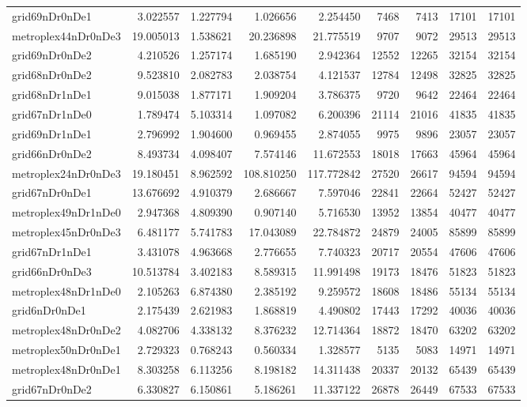 \begin{longtable}{|l|r|r|r|r|r|r|r|r|}
grid69nDr0nDe1 & 3.022557 & 1.227794 & 1.026656 & 2.254450 & 7468 & 7413 & 17101 & 17101 \\
metroplex44nDr0nDe3 & 19.005013 & 1.538621 & 20.236898 & 21.775519 & 9707 & 9072 & 29513 & 29513 \\
grid69nDr0nDe2 & 4.210526 & 1.257174 & 1.685190 & 2.942364 & 12552 & 12265 & 32154 & 32154 \\
grid68nDr0nDe2 & 9.523810 & 2.082783 & 2.038754 & 4.121537 & 12784 & 12498 & 32825 & 32825 \\
grid68nDr1nDe1 & 9.015038 & 1.877171 & 1.909204 & 3.786375 & 9720 & 9642 & 22464 & 22464 \\
grid67nDr1nDe0 & 1.789474 & 5.103314 & 1.097082 & 6.200396 & 21114 & 21016 & 41835 & 41835 \\
grid69nDr1nDe1 & 2.796992 & 1.904600 & 0.969455 & 2.874055 & 9975 & 9896 & 23057 & 23057 \\
grid66nDr0nDe2 & 8.493734 & 4.098407 & 7.574146 & 11.672553 & 18018 & 17663 & 45964 & 45964 \\
metroplex24nDr0nDe3 & 19.180451 & 8.962592 & 108.810250 & 117.772842 & 27520 & 26617 & 94594 & 94594 \\
grid67nDr0nDe1 & 13.676692 & 4.910379 & 2.686667 & 7.597046 & 22841 & 22664 & 52427 & 52427 \\
metroplex49nDr1nDe0 & 2.947368 & 4.809390 & 0.907140 & 5.716530 & 13952 & 13854 & 40477 & 40477 \\
metroplex45nDr0nDe3 & 6.481177 & 5.741783 & 17.043089 & 22.784872 & 24879 & 24005 & 85899 & 85899 \\
grid67nDr1nDe1 & 3.431078 & 4.963668 & 2.776655 & 7.740323 & 20717 & 20554 & 47606 & 47606 \\
grid66nDr0nDe3 & 10.513784 & 3.402183 & 8.589315 & 11.991498 & 19173 & 18476 & 51823 & 51823 \\
metroplex48nDr1nDe0 & 2.105263 & 6.874380 & 2.385192 & 9.259572 & 18608 & 18486 & 55134 & 55134 \\
grid6nDr0nDe1 & 2.175439 & 2.621983 & 1.868819 & 4.490802 & 17443 & 17292 & 40036 & 40036 \\
metroplex48nDr0nDe2 & 4.082706 & 4.338132 & 8.376232 & 12.714364 & 18872 & 18470 & 63202 & 63202 \\
metroplex50nDr0nDe1 & 2.729323 & 0.768243 & 0.560334 & 1.328577 & 5135 & 5083 & 14971 & 14971 \\
metroplex48nDr0nDe1 & 8.303258 & 6.113256 & 8.198182 & 14.311438 & 20337 & 20132 & 65439 & 65439 \\
grid67nDr0nDe2 & 6.330827 & 6.150861 & 5.186261 & 11.337122 & 26878 & 26449 & 67533 & 67533 \\

\end{longtable}
